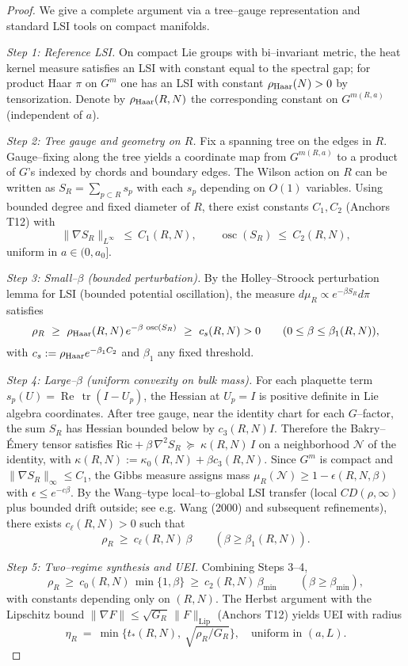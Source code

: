 \documentclass[11pt]{amsart}
\theoremstyle{plain}
\theoremstyle{definition}
\theoremstyle{remark}
\begin{document}
\begin{proof}
We give a complete argument via a tree–gauge representation and standard LSI tools on compact manifolds.

\emph{Step 1: Reference LSI.} On compact Lie groups with bi--invariant metric, the heat kernel measure satisfies an LSI with constant equal to the spectral gap; for product Haar $\pi$ on $G^{m}$ one has an LSI with constant $\rho_{\rm Haar}(N)>0$ by tensorization. Denote by $\rho_{\rm Haar}(R,N)$ the corresponding constant on $G^{m(R,a)}$ (independent of $a$).

\emph{Step 2: Tree gauge and geometry on $R$.} Fix a spanning tree on the edges in $R$. Gauge–fixing along the tree yields a coordinate map from $G^{m(R,a)}$ to a product of $G$'s indexed by chords and boundary edges. The Wilson action on $R$ can be written as $S_R=\sum_{p\subset R} s_p$ with each $s_p$ depending on $O(1)$ variables. Using bounded degree and fixed diameter of $R$, there exist constants $C_1,C_2$ (Anchors T12) with
\[
  \|\nabla S_R\|_{L^\infty}\ \le\ C_1(R,N),\qquad \operatorname{osc}(S_R)\ \le\ C_2(R,N),
\]
uniform in $a\in(0,a_0]$.

\emph{Step 3: Small–$\beta$ (bounded perturbation).} By the Holley–Stroock perturbation lemma for LSI (bounded potential oscillation), the measure $d\mu_R\propto e^{-\beta S_R}d\pi$ satisfies
\[
  \rho_R\ \ge\ \rho_{\rm Haar}(R,N)\,e^{-\beta\,\operatorname{osc}(S_R)}\ \ge\ c_s(R,N)>0\qquad (0\le \beta\le \beta_1(R,N)),
\]
with $c_s:=\rho_{\rm Haar} e^{-\beta_1 C_2}$ and $\beta_1$ any fixed threshold.

\emph{Step 4: Large–$\beta$ (uniform convexity on bulk mass).} For each plaquette term $s_p(U)=\operatorname{Re}\,\operatorname{tr}(I-U_p)$, the Hessian at $U_p=I$ is positive definite in Lie algebra coordinates. After tree gauge, near the identity chart for each $G$–factor, the sum $S_R$ has Hessian bounded below by $c_3(R,N) I$. Therefore the Bakry–Émery tensor satisfies $\mathrm{Ric}+\beta\,\nabla^2 S_R\ \succeq\ \kappa(R,N)\,I$ on a neighborhood $\mathcal N$ of the identity, with $\kappa(R,N):=\kappa_0(R,N)+\beta c_3(R,N)$. Since $G^{m}$ is compact and $\|\nabla S_R\|_{\infty}\le C_1$, the Gibbs measure assigns mass $\mu_R(\mathcal N)\ge 1-\epsilon(R,N,\beta)$ with $\epsilon\le e^{-c\beta}$. By the Wang–type local–to–global LSI transfer (local $CD(\rho,\infty)$ plus bounded drift outside; see e.g. Wang (2000) and subsequent refinements), there exists $c_\ell(R,N)>0$ such that
\[
  \rho_R\ \ge\ c_\ell(R,N)\,\beta\qquad (\beta\ge \beta_1(R,N)).
\]

\emph{Step 5: Two–regime synthesis and UEI.} Combining Steps 3–4,
\[
  \rho_R\ \ge\ c_0(R,N)\,\min\{1,\beta\}\ \ge\ c_2(R,N)\,\beta_{\min}\qquad (\beta\ge \beta_{\min}),
\]
with constants depending only on $(R,N)$. The Herbst argument with the Lipschitz bound $\|\nabla F\|\le \sqrt{G_R}\,\|F\|_{\mathrm{Lip}}$ (Anchors T12) yields UEI with radius
\[
  \eta_R\ =\ \min\Big\{t_*(R,N),\ \sqrt{\rho_R/G_R}\Big\},\quad \text{uniform in }(a,L).
\]
\end{proof}
\end{document}
